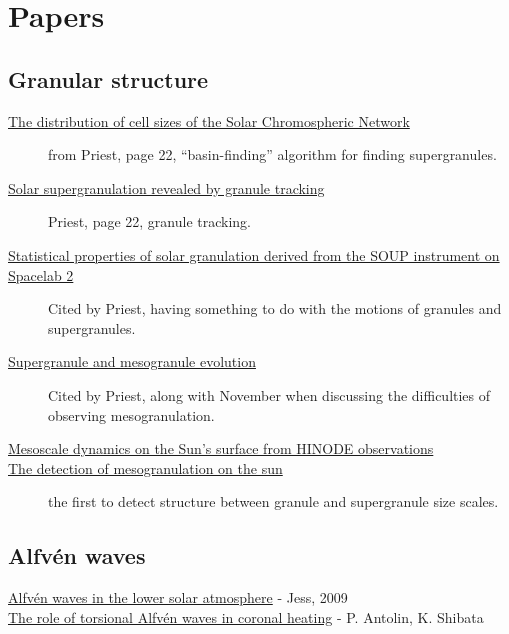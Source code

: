 \documentclass{article}
\begin{document}
\section{Papers}
\subsection{Granular structure}
\begin{description}
    \item [\href{http://cdsads.u-strasbg.fr/abs/1997ApJ...481..988H}
        {The distribution of cell sizes of the Solar Chromospheric Network}]
        from Priest, page 22, ``basin-finding'' algorithm for finding
        supergranules.
    \item [\href{http://cdsads.u-strasbg.fr/abs/2008A\%26A...479L..17R}
        {Solar supergranulation revealed by granule tracking}]
        Priest, page 22, granule tracking.
    \item [\href{http://cdsads.u-strasbg.fr/abs/1989ApJ...336..475T}
        {Statistical properties of solar granulation derived
        from the SOUP instrument on Spacelab 2}]
        Cited by Priest, having something to do with the motions of granules and supergranules.
    \item [\href{http://cdsads.u-strasbg.fr/abs/2000SoPh..193..313S}
        {Supergranule and mesogranule evolution}]
        Cited by Priest, along with November when
        discussing the difficulties of observing mesogranulation.
    \item [\href{http://adsabs.harvard.edu/cgi-bin/bib_query?arXiv:0902.2299}
        {Mesoscale dynamics on the Sun's surface from HINODE
        observations}]
    \item [\href{http://adsabs.harvard.edu/abs/1981ApJ...245L.123N}
        {The detection of mesogranulation on the sun}]
        the first to detect structure between granule
        and supergranule size scales.
\end{description}

\subsection{Alfv\'en waves}
\begin{description}
    \item [\href{http://arxiv.org/abs/0903.3546}
        {Alfv\'en waves in the lower solar atmosphere}
        - Jess, 2009]
    \item [\href{https://arxiv.org/abs/0910.0962}
        {The role of torsional Alfv\'en waves in coronal heating}
        - P. Antolin, K. Shibata]
\end{description}
\end{document}
